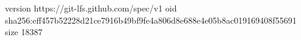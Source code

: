 version https://git-lfs.github.com/spec/v1
oid sha256:eff457b52228d21ce7916b49bf9fe4a806d8e688e4e05b8ac019169408f55691
size 18387
